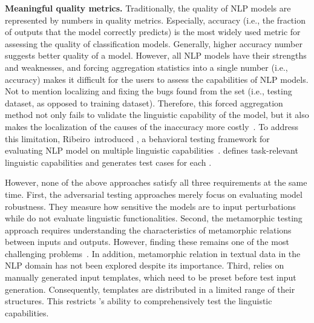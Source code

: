 \noindent \textbf{Meaningful quality metrics.}  
Traditionally, the quality of NLP models are
represented by numbers in quality metrics. Especially, accuracy (i.e., the fraction of outputs that the
model correctly predicts) is the most widely used metric for assessing
the quality of classification models. 
Generally, higher accuracy number suggests better quality of a model.
However, all NLP models have their strengths and weaknesses, and 
forcing aggregation statistics into a single number (i.e., accuracy) makes it difficult for the users to assess the capabilities of NLP models.  Not to
mention localizing and fixing the bugs found from the \ho
set (i.e., testing dataset, as opposed to training dataset). Therefore, this forced aggregation method not only fails to
validate the linguistic capability of the model, but it also makes the localization of the
causes of the inaccuracy more costly~\cite{wu2019errudite}.
To address this limitation,
Ribeiro~\etal introduced \Cklst, a behavioral testing framework for
evaluating NLP model on multiple linguistic
capabilities~\cite{marcoACL2020checklist}. \Cklst defines
task-relevant linguistic capabilities and generates test cases for
each \lc.

However, none of the above approaches satisfy all three requirements
at the same time. First, the adversarial testing approaches merely
focus on evaluating model robustness. They measure how sensitive the models
are to input perturbations while do not
evaluate linguistic functionalities.
Second, the metamorphic testing approach requires understanding the characteristics of metamorphic relations between inputs
and outputs. However, finding these remains one of the most challenging
problems~\cite{segura2016metamorphictest}. In addition, metamorphic
relation in textual data in the NLP domain has not been explored despite
its importance.
Third, \Cklst relies on manually generated input templates,
which need to be preset before test input generation. Consequently,
\Cklst templates are distributed in a limited range of their
structures. This restricts \Cklst's ability to comprehensively test
the linguistic capabilities.

